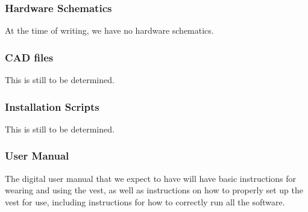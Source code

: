 \subsubsection{Hardware Schematics}
At the time of writing, we have no hardware schematics.

\subsubsection{CAD files}
This is still to be determined.

\subsubsection{Installation Scripts}
This is still to be determined.

\subsubsection{User Manual}
The digital user manual that we expect to have will have basic instructions for wearing and using the vest, as well as instructions on how to properly set up the vest for use, including instructions for how to correctly run all the software.
